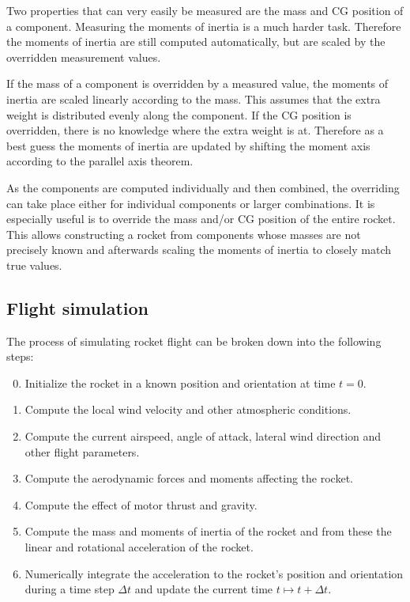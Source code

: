 Two properties that can very easily be measured are the mass and
CG position of a component.  Measuring the moments of inertia is a
much harder task.  Therefore the moments of inertia are still computed
automatically, but are scaled by the overridden measurement values.

If the mass of a component is overridden by a measured value, the
moments of inertia are scaled linearly according to the mass.  This
assumes that the extra weight is distributed evenly along the
component.  If the CG position is overridden, there is no knowledge
where the extra weight is at.  Therefore as a best guess the moments
of inertia are updated by shifting the moment axis according to the
parallel axis theorem.

As the components are computed individually and then combined, the
overriding can take place either for individual components or larger
combinations.  It is especially useful is to override the mass and/or CG
position of the entire rocket.  This allows constructing a rocket from
components whose masses are not precisely known and afterwards scaling
the moments of inertia to closely match true values.



\subsection{Flight simulation}

The process of simulating rocket flight can be broken down into the
following steps:

\begin{enumerate}
\setcounter{enumi}{-1}
\item Initialize the rocket in a known position and orientation at
  time $t=0$.
\item Compute the local wind velocity and other atmospheric conditions.
\item Compute the current airspeed, angle of attack, lateral wind
  direction and other flight parameters.
\item Compute the aerodynamic forces and moments affecting the rocket.
\item Compute the effect of motor thrust and gravity.
\item Compute the mass and moments of inertia of the rocket and from
  these the linear and rotational acceleration of the rocket.
\item Numerically integrate the acceleration to the rocket's position
  and orientation during a time step $\Delta t$ and update the current
  time $t \mapsto t+\Delta t$.
\end{enumerate}


